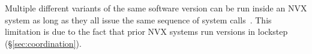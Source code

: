 
Multiple different variants of the same software version can be run inside an
NVX system as long as they all issue the same sequence of system
calls~\cite{mx}.  This limitation is due to the fact that prior NVX systems run
versions in lockstep (\S\ref{sec:coordination}).






